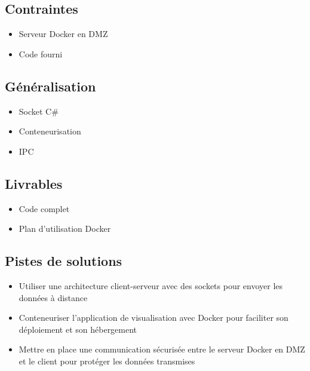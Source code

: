 \subsection*{Contraintes}
{}
\begin{itemize}
	\item Serveur Docker en DMZ
	\item Code fourni
\end{itemize}

\subsection*{Généralisation}
{}
\begin{itemize}
	\item Socket C\#
	\item Conteneurisation
	\item IPC
\end{itemize}

\subsection*{Livrables}
{}
\begin{itemize}
	\item Code complet
	\item Plan d'utilisation Docker
\end{itemize}

\subsection*{Pistes de solutions}
{}
\begin{itemize}
	\item Utiliser une architecture client-serveur avec des sockets pour envoyer les données à distance
	\item Conteneuriser l'application de visualisation avec Docker pour faciliter son déploiement et son hébergement
	\item Mettre en place une communication sécurisée entre le serveur Docker en DMZ et le client pour protéger les données transmises
\end{itemize}

